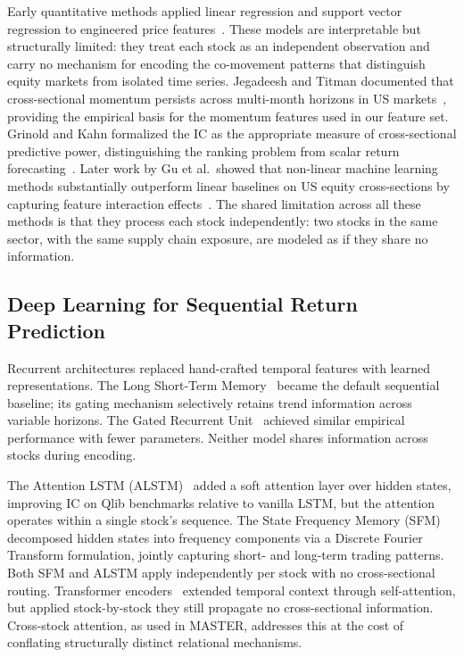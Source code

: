 \documentclass[journal]{IEEEtran}
\begin{document}
Early quantitative methods applied linear regression and support vector
regression to engineered price features~\cite{gu2020empirical}. These
models are interpretable but structurally limited: they treat each stock
as an independent observation and carry no mechanism for encoding the
co-movement patterns that distinguish equity markets from isolated time
series. Jegadeesh and Titman documented that cross-sectional momentum
persists across multi-month horizons in US markets~\cite{jegadeesh1993returns},
providing the empirical basis for the momentum features used in our
feature set. Grinold and Kahn formalized the IC as the appropriate
measure of cross-sectional predictive power, distinguishing the ranking
problem from scalar return forecasting~\cite{grinold2000active}. Later
work by Gu et al.\ showed that non-linear machine learning methods
substantially outperform linear baselines on US equity cross-sections by
capturing feature interaction effects~\cite{gu2020empirical}. The shared
limitation across all these methods is that they process each stock
independently: two stocks in the same sector, with the same supply chain
exposure, are modeled as if they share no information.

\subsection{Deep Learning for Sequential Return Prediction}

Recurrent architectures replaced hand-crafted temporal features with
learned representations. The Long Short-Term
Memory~\cite{hochreiter1997long} became the default sequential baseline;
its gating mechanism selectively retains trend information across
variable horizons. The Gated Recurrent Unit~\cite{cho2014learning}
achieved similar empirical performance with fewer parameters. Neither
model shares information across stocks during encoding.

The Attention LSTM (ALSTM)~\cite{qin2017dual} added a soft attention
layer over hidden states, improving IC on Qlib benchmarks relative to
vanilla LSTM, but the attention operates within a single stock's
sequence. The State Frequency Memory (SFM)~\cite{zhang2017stock}
decomposed hidden states into frequency components via a Discrete
Fourier Transform formulation, jointly capturing short- and long-term
trading patterns. Both SFM and ALSTM apply independently per stock
with no cross-sectional routing. Transformer
encoders~\cite{vaswani2017attention} extended temporal context through
self-attention, but applied stock-by-stock they still propagate no
cross-sectional information. Cross-stock attention, as used in MASTER,
addresses this at the cost of conflating structurally distinct relational
mechanisms.
\end{document}
